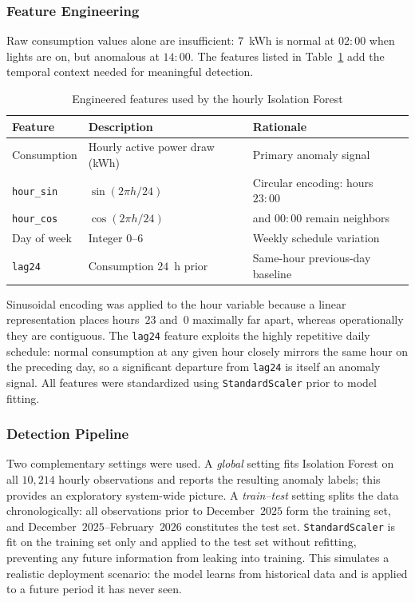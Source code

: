 \documentclass[11pt]{article}
\begin{document}
\subsubsection*{Feature Engineering}
Raw consumption values alone are insufficient: $7$~kWh is normal at $02{:}00$ when lights are on, but anomalous at $14{:}00$. The features listed in Table~\ref{tab:features} add the temporal context needed for meaningful detection.

\begin{table}[H]
\centering
\caption{Engineered features used by the hourly Isolation Forest}
\label{tab:features}
\begin{tabular}{p{3.2cm}p{4.5cm}p{5.5cm}}
\toprule
\textbf{Feature} & \textbf{Description} & \textbf{Rationale}\\
\midrule
Consumption        & Hourly active power draw (kWh) & Primary anomaly signal\\
\texttt{hour\_sin} & $\sin(2\pi h/24)$ & Circular encoding: hours $23{:}00$\\
\texttt{hour\_cos} & $\cos(2\pi h/24)$ & and $00{:}00$ remain neighbors\\
Day of week        & Integer $0$--$6$ & Weekly schedule variation\\
\texttt{lag24}     & Consumption $24$~h prior & Same-hour previous-day baseline\\
\bottomrule
\end{tabular}
\end{table}

Sinusoidal encoding was applied to the hour variable because a linear representation places hours~$23$ and~$0$ maximally far apart, whereas operationally they are contiguous. The \texttt{lag24} feature exploits the highly repetitive daily schedule: normal consumption at any given hour closely mirrors the same hour on the preceding day, so a significant departure from \texttt{lag24} is itself an anomaly signal. All features were standardized using \texttt{StandardScaler} prior to model fitting.

\subsubsection*{Detection Pipeline}
Two complementary settings were used. A \emph{global} setting fits Isolation Forest on all $10{,}214$ hourly observations and reports the resulting anomaly labels; this provides an exploratory system-wide picture. A \emph{train--test} setting splits the data chronologically: all observations prior to December~$2025$ form the training set, and December~$2025$--February~$2026$ constitutes the test set. \texttt{StandardScaler} is fit on the training set only and applied to the test set without refitting, preventing any future information from leaking into training. This simulates a realistic deployment scenario: the model learns from historical data and is applied to a future period it has never seen.
\end{document}
